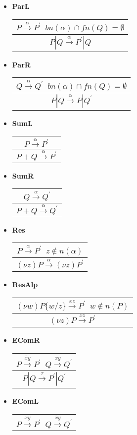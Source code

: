 \begin{description}
\begin{itemize}
\begin{description}
    \begin{itemize}
	\item
	  \bf{ParL}
	  \begin{tabular}{c}
	      $P \xrightarrow{\alpha} P^{'}\;\; bn(\alpha)\cap fn(Q)=\emptyset$
	    \\\hline
	      $P|Q \xrightarrow{\alpha} P^{'}|Q$
	  \end{tabular}
	\item
	  \bf{ParR}
	  \begin{tabular}{c}
	      $Q \xrightarrow{\alpha} Q^{'}\;\; bn(\alpha)\cap fn(Q)=\emptyset$
	    \\\hline
	      $P|Q \xrightarrow{\alpha} P|Q^{'}$
	  \end{tabular}
	\item
	  \bf{SumL}
	  \begin{tabular}{c}
	      $P \xrightarrow{\alpha} P^{'}$
	    \\\hline
	      $P+Q \xrightarrow{\alpha} P^{'}$
	  \end{tabular}
	\item
	  \bf{SumR}
	  \begin{tabular}{c}
	      $Q \xrightarrow{\alpha} Q^{'}$
	    \\\hline
	      $P+Q \xrightarrow{\alpha} Q^{'}$
	    \end{tabular}
	\item
	  \bf{Res}
	  \begin{tabular}{c}
	      $P \xrightarrow{\alpha} P^{'}\;\; z\notin n(\alpha)$
	    \\\hline
	      $(\nu z) P \xrightarrow{\alpha} (\nu z) P^{'}$
	  \end{tabular}
	\item
	  \bf{ResAlp}
	  \begin{tabular}{c}
	      $(\nu w)P\{w/z\} \xrightarrow{xz} P^{'}\;\; w\notin n(P)$
	    \\\hline
	      $(\nu z) P \xrightarrow{xz} P^{'}$
	  \end{tabular}
	\item
	  \bf{EComR}
	  \begin{tabular}{c}
	      $P \xrightarrow{\overline{x}y} P^{'}\;\; Q\xrightarrow{xy} Q^{'}$
	    \\\hline
	      $P|Q \xrightarrow{\tau} P^{'}|Q^{'}$
	  \end{tabular}
	\item
	  \bf{EComL}
	  \begin{tabular}{c}
	      $P \xrightarrow{xy} P^{'}\;\; Q\xrightarrow{\overline{x}y} Q^{'}$

\end{tabular}
\end{itemize}
\end{description}
\end{itemize}
\end{description}
